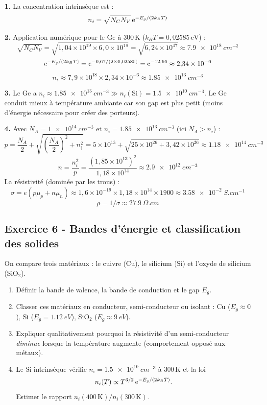 \documentclass[12pt,a4paper]{article}
\begin{document}
\begin{boitecorrige}
\textbf{1.} La concentration intrinsèque est :
\[
n_i = \sqrt{N_C N_V}\,\mathrm{e}^{-E_g/(2k_BT)}
\]

\textbf{2.} Application numérique pour le Ge à 300\,K ($k_BT = 0{,}02585\,\text{eV}$) :
\[
\sqrt{N_C N_V} = \sqrt{1{,}04\times10^{19}\times6{,}0\times10^{18}} = \sqrt{6{,}24\times10^{37}} \approx \qty{7.9e18}{cm^{-3}}
\]
\[
\mathrm{e}^{-E_g/(2k_BT)} = \mathrm{e}^{-0{,}67/(2\times0{,}02585)} = \mathrm{e}^{-12{,}96} \approx 2{,}34\times10^{-6}
\]
\[
\boxed{n_i \approx 7{,}9\times10^{18}\times2{,}34\times10^{-6} \approx \qty{1.85e13}{cm^{-3}}}
\]

\textbf{3.} Le Ge a $n_i \approx \qty{1.85e13}{cm^{-3}} \gg n_i(\text{Si}) = \qty{1.5e10}{cm^{-3}}$. Le Ge conduit mieux à température ambiante car son gap est plus petit (moins d'énergie nécessaire pour créer des porteurs).

\textbf{4.} Avec $N_A = \qty{1e14}{cm^{-3}}$ et $n_i = \qty{1.85e13}{cm^{-3}}$ (ici $N_A > n_i$) :
\[
p = \frac{N_A}{2} + \sqrt{\left(\frac{N_A}{2}\right)^2 + n_i^2} = 5\times10^{13} + \sqrt{25\times10^{26} + 3{,}42\times10^{26}} \approx \qty{1.18e14}{cm^{-3}}
\]
\[
n = \frac{n_i^2}{p} = \frac{(1{,}85\times10^{13})^2}{1{,}18\times10^{14}} \approx \qty{2.9e12}{cm^{-3}}
\]
La résistivité (dominée par les trous) :
\[
\sigma = e(p\mu_p + n\mu_n) \approx 1{,}6\times10^{-19}\times1{,}18\times10^{14}\times1900 \approx \qty{3.58e-2}{S.cm^{-1}}
\]
\[
\rho = 1/\sigma \approx \qty{27.9}{\Omega.cm}
\]
\end{boitecorrige}

\subsection*{Exercice 6 - Bandes d'énergie et classification des solides \niveau{\facile}}

\begin{boiteexercice}
On compare trois matériaux : le cuivre (Cu), le silicium (Si) et l'oxyde de silicium (SiO$_2$).
\begin{enumerate}
  \item Définir la bande de valence, la bande de conduction et le gap $E_g$.
  \item Classer ces matériaux en conducteur, semi-conducteur ou isolant :
  Cu ($E_g \approx 0$), Si ($E_g = \qty{1.12}{eV}$), SiO$_2$ ($E_g \approx \qty{9}{eV}$).
  \item Expliquer qualitativement pourquoi la résistivité d'un
  semi-conducteur \emph{diminue} lorsque la température augmente
  (comportement opposé aux métaux).
  \item Le Si intrinsèque vérifie $n_i = \qty{1.5e10}{cm^{-3}}$ à
  300\,K et la loi
  \[ n_i(T) \propto T^{3/2}\,\mathrm{e}^{-E_g/(2k_BT)}. \]
  Estimer le rapport $n_i(400\,\text{K})/n_i(300\,\text{K})$.
\end{enumerate}
\end{boiteexercice}
\end{document}
